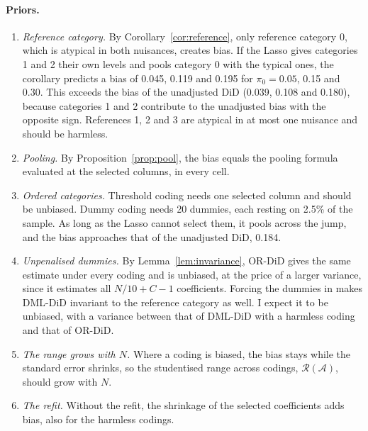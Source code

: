 \documentclass[11pt]{article}
\newenvironment{ins}{\begin{leftbar}}{\end{leftbar}}
\theoremstyle{plain}
\theoremstyle{remark}
\begin{document}
\begin{ins}
\paragraph{Priors.}
\begin{enumerate}
\item \emph{Reference category.} By Corollary~\ref{cor:reference}, only
  reference category 0, which is atypical in both nuisances, creates bias. If
  the Lasso gives categories 1 and 2 their own levels and pools category 0 with
  the typical ones, the corollary predicts a bias of 0.045, 0.119 and 0.195 for
  $\pi_0=0.05$, 0.15 and 0.30. This exceeds the bias of the unadjusted DiD
  (0.039, 0.108 and 0.180), because categories 1 and 2 contribute to the
  unadjusted bias with the opposite sign. References 1, 2 and 3 are atypical in
  at most one nuisance and should be harmless.
\item \emph{Pooling.} By Proposition~\ref{prop:pool}, the bias equals the pooling
  formula evaluated at the selected columns, in every cell.
\item \emph{Ordered categories.} Threshold coding needs one selected column and
  should be unbiased. Dummy coding needs 20 dummies, each resting on 2.5\% of the
  sample. As long as the Lasso cannot select them, it pools across the jump, and
  the bias approaches that of the unadjusted DiD, 0.184.
\item \emph{Unpenalised dummies.} By Lemma~\ref{lem:invariance}, OR-DiD gives the
  same estimate under every coding and is unbiased, at the price of a larger
  variance, since it estimates all $N/10+C-1$ coefficients. Forcing the dummies
  in makes DML-DiD invariant to the reference category as well. I expect it to
  be unbiased, with a variance between that of DML-DiD with a harmless coding
  and that of OR-DiD.
\item \emph{The range grows with $N$.} Where a coding is biased, the bias stays
  while the standard error shrinks, so the studentised range across codings,
  $\mathcal R(\mathcal A)$, should grow with $N$.
\item \emph{The refit.} Without the refit, the shrinkage of the selected
  coefficients adds bias, also for the harmless codings.
\end{enumerate}

\end{ins}
\begin{table}[ht]
\centering\footnotesize
\setlength{\tabcolsep}{2.8pt}

\caption{D4a at $N=4000$, $R=200$, $\theta_0=1$. The label of each coding says in
which nuisance its reference category is atypical. ``Pool'' is the formula of
Proposition~\ref{prop:pool} evaluated at the selected columns; ``No refit'' is
the same Lasso fit plugged in without refitting; ``Selected'' is the average
number of dummies the Lasso selects for the propensity score and the trend.
OR-DiD is identical under all four reference categories.}
\label{tab:d4a}
\end{table}
\end{document}
